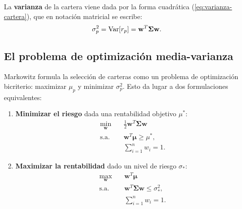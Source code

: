 La \textbf{varianza} de la cartera viene dada por la forma cuadrática
(\ref{eq:varianza-cartera}), que en notación matricial se escribe:
\begin{equation}
    \sigma_p^2 = \mathop{\textnormal{Var}}\nolimits[r_p]
    = \mathbf{w}^T \boldsymbol{\Sigma} \mathbf{w}.
    \label{eq:varianza-cartera-matricial}
\end{equation}

\subsection{El problema de optimización media-varianza}

Markowitz formula la selección de carteras como un problema de
optimización bicriterio: maximizar $\mu_p$ y minimizar $\sigma_p^2$.
Esto da lugar a dos formulaciones equivalentes:

\begin{enumerate}
    \item \textbf{Minimizar el riesgo} dada una rentabilidad objetivo
          $\mu^*$:
          \begin{equation}
              \begin{aligned}
                  \min_{\mathbf{w}} \quad & \tfrac{1}{2} \mathbf{w}^T
                      \boldsymbol{\Sigma} \mathbf{w} \\
                  \text{s.a.} \quad & \mathbf{w}^T \boldsymbol{\mu}
                      \ge \mu^*, \\
                  & \sum_{i=1}^{n} w_i = 1.
              \end{aligned}
              \label{eq:qp-riesgo}
          \end{equation}

    \item \textbf{Maximizar la rentabilidad} dado un nivel de riesgo
          $\sigma_*$:
          \begin{equation}
              \begin{aligned}
                  \max_{\mathbf{w}} \quad & \mathbf{w}^T \boldsymbol{\mu} \\
                  \text{s.a.} \quad & \mathbf{w}^T \boldsymbol{\Sigma}
                      \mathbf{w} \le \sigma^2_*, \\
                  & \sum_{i=1}^{n} w_i = 1.
              \end{aligned}
              \label{eq:qp-rentabilidad}
          \end{equation}
\end{enumerate}


